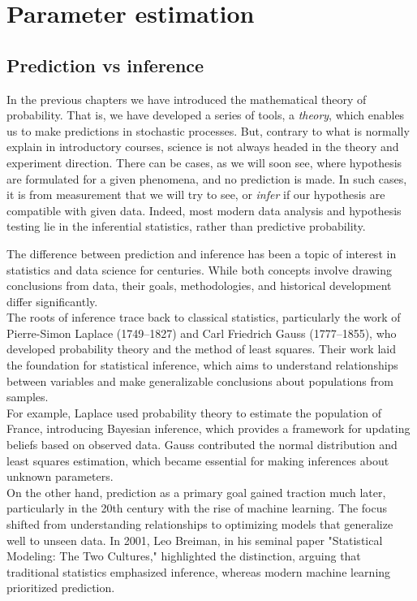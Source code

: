 \documentclass{book}
\begin{document}
\chapter{Parameter estimation}

\section{Prediction vs inference}
In the previous chapters we have introduced the mathematical theory of probability. That is, we have developed a series of tools, a \textit{theory}, which enables us to make predictions in stochastic processes. But, contrary to what is normally explain in introductory courses, science is not always headed in the theory and experiment direction. There can be cases, as we will soon see, where hypothesis are formulated for a given phenomena, and no prediction is made. In such cases, it is from measurement that we will try to see, or \textit{infer} if our hypothesis are compatible with given data. Indeed, most modern data analysis and hypothesis testing lie in the inferential statistics, rather than predictive probability.

The difference between prediction and inference has been a topic of interest in statistics and data science for centuries. While both concepts involve drawing conclusions from data, their goals, methodologies, and historical development differ significantly.\\

The roots of inference trace back to classical statistics, particularly the work of Pierre-Simon Laplace (1749–1827) and Carl Friedrich Gauss (1777–1855), who developed probability theory and the method of least squares. Their work laid the foundation for statistical inference, which aims to understand relationships between variables and make generalizable conclusions about populations from samples.\\

For example, Laplace used probability theory to estimate the population of France, introducing Bayesian inference, which provides a framework for updating beliefs based on observed data. Gauss contributed the normal distribution and least squares estimation, which became essential for making inferences about unknown parameters.\\

On the other hand, prediction as a primary goal gained traction much later, particularly in the 20th century with the rise of machine learning. The focus shifted from understanding relationships to optimizing models that generalize well to unseen data. In 2001, Leo Breiman, in his seminal paper "Statistical Modeling: The Two Cultures," highlighted the distinction, arguing that traditional statistics emphasized inference, whereas modern machine learning prioritized prediction.\\
\end{document}
